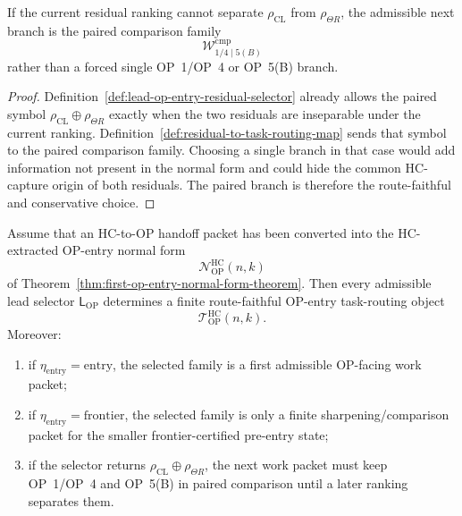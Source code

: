\begin{proposition}
\label{prop:paired-comparison-branch-safe-non-dominant-branch}
If the current residual ranking cannot separate $\rho_{\mathrm{CL}}$ from $\rho_{\Theta R}$, the admissible next branch is the paired comparison family
\[
 \mathcal W_{1/4\mid 5(B)}^{\mathrm{cmp}}
\]
rather than a forced single OP~1/OP~4 or OP~5(B) branch.
\end{proposition}

\begin{proof}
Definition~\ref{def:lead-op-entry-residual-selector} already allows the paired symbol $\rho_{\mathrm{CL}}\oplus\rho_{\Theta R}$ exactly when the two residuals are inseparable under the current ranking. Definition~\ref{def:residual-to-task-routing-map} sends that symbol to the paired comparison family. Choosing a single branch in that case would add information not present in the normal form and could hide the common HC-capture origin of both residuals. The paired branch is therefore the route-faithful and conservative choice.
\end{proof}

\begin{theorem}
\label{thm:first-op-entry-task-routing-theorem}
Assume that an HC-to-OP handoff packet has been converted into the HC-extracted OP-entry normal form
\[
 \mathcal N_{\mathrm{OP}}^{\mathrm{HC}}(n,k)
\]
of Theorem~\ref{thm:first-op-entry-normal-form-theorem}. Then every admissible lead selector $\mathsf L_{\mathrm{OP}}$ determines a finite route-faithful OP-entry task-routing object
\[
 \mathcal T_{\mathrm{OP}}^{\mathrm{HC}}(n,k).
\]
Moreover:
\begin{enumerate}[leftmargin=2em,label=(\roman*)]
 \item if $\eta_{\mathrm{entry}}=\mathrm{entry}$, the selected family is a first admissible OP-facing work packet;
 \item if $\eta_{\mathrm{entry}}=\mathrm{frontier}$, the selected family is only a finite sharpening/comparison packet for the smaller frontier-certified pre-entry state;
 \item if the selector returns $\rho_{\mathrm{CL}}\oplus\rho_{\Theta R}$, the next work packet must keep OP~1/OP~4 and OP~5(B) in paired comparison until a later ranking separates them.
\end{enumerate}
\end{theorem}

